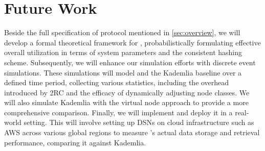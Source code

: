 \section{Future Work}

Beside the full specification of \dht protocol mentioned in \autoref{sec:overview}, we will develop a formal theoretical framework for \dht, probabilistically formulating effective overall utilization in terms of system parameters and the consistent hashing scheme.
Subsequently, we will enhance our simulation efforts with discrete event simulations. These simulations will model \dht and the Kademlia baseline over a defined time period, collecting various statistics, including the overhead introduced by 2RC and the efficacy of dynamically adjusting node classes. We will also simulate Kademlia with the virtual node approach to provide a more comprehensive comparison.
Finally, we will implement \dht and deploy it in a real-world setting. This will involve setting up DSNs on cloud infrastructure such as AWS across various global regions to measure \dht's actual data storage and retrieval performance, comparing it against Kademlia.
